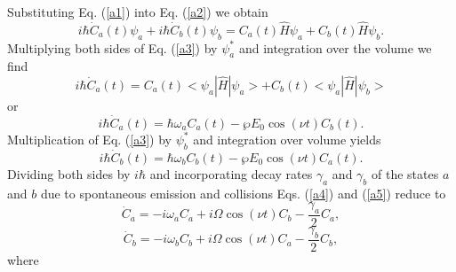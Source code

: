 \documentclass[preprint,preprintnumbers]{revtex4}
\begin{document}
Substituting Eq. (\ref{a1}) into Eq. (\ref{a2}) we obtain%
\begin{equation}
i\hbar \dot{C}_{a}(t)\psi _{a}+i\hbar \dot{C}_{b}(t)\psi _{b}=C_{a}(t)\hat{H}%
\psi _{a}+C_{b}(t)\hat{H}\psi _{b}.  \label{a3}
\end{equation}%
Multiplying both sides of Eq. (\ref{a3}) by $\psi _{a}^{\ast }$ and
integration over the volume we find
\begin{equation}
i\hbar \dot{C}_{a}(t)=C_{a}(t)<\psi _{a}|\hat{H}|\psi _{a}>+C_{b}(t)<\psi
_{a}|\hat{H}|\psi _{b}>
\end{equation}%
or
\begin{equation}
i\hbar \dot{C}_{a}(t)=\hbar \omega _{a}C_{a}(t)-\wp E_{0}\cos (\nu
t)C_{b}(t).  \label{a4}
\end{equation}%
Multiplication of Eq. (\ref{a3}) by $\psi _{b}^{\ast }$ and integration over
volume yields%
\begin{equation}
i\hbar \dot{C}_{b}(t)=\hbar \omega _{b}C_{b}(t)-\wp E_{0}\cos (\nu
t)C_{a}(t).  \label{a5}
\end{equation}%
Dividing both sides by $i\hbar $ and incorporating decay rates $\gamma _{a}$
and $\gamma _{b}$ of the states $a$ and $b$ due to spontaneous emission and
collisions Eqs. (\ref{a4}) and (\ref{a5}) reduce to
\begin{equation}
\dot{C}_{a}=-i\omega _{a}C_{a}+i\Omega \cos (\nu t)C_{b}-\frac{\gamma _{a}}{2%
}C_{a},  \label{a6}
\end{equation}%
\begin{equation}
\dot{C}_{b}=-i\omega _{b}C_{b}+i\Omega \cos (\nu t)C_{a}-\frac{\gamma _{b}}{2%
}C_{b},  \label{a7}
\end{equation}%
where
\end{document}

